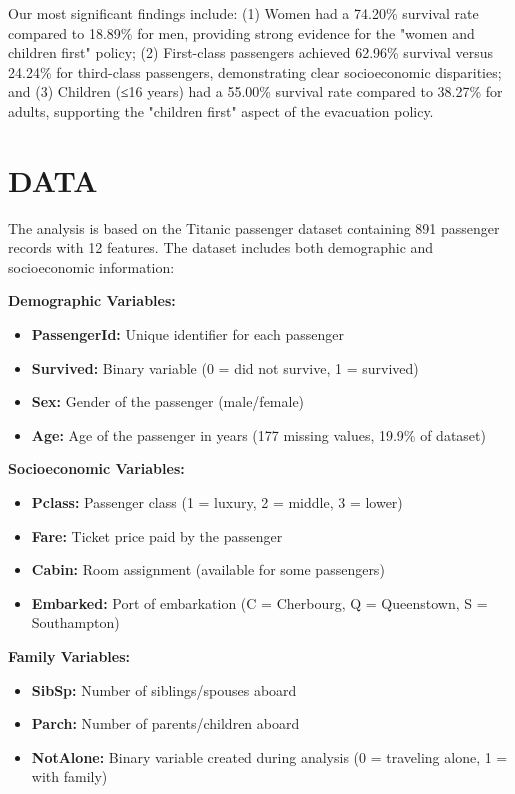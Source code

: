 \documentclass[letterpaper, 10 pt, conference]{ieeeconf}  %
\begin{document}
Our most significant findings include: (1) Women had a 74.20\% survival rate compared to 18.89\% for men, providing strong evidence for the "women and children first" policy; (2) First-class passengers achieved 62.96\% survival versus 24.24\% for third-class passengers, demonstrating clear socioeconomic disparities; and (3) Children (≤16 years) had a 55.00\% survival rate compared to 38.27\% for adults, supporting the "children first" aspect of the evacuation policy.

\section{DATA}

The analysis is based on the Titanic passenger dataset containing 891 passenger records with 12 features. The dataset includes both demographic and socioeconomic information:

\textbf{Demographic Variables:}
\begin{itemize}
\item \textbf{PassengerId:} Unique identifier for each passenger
\item \textbf{Survived:} Binary variable (0 = did not survive, 1 = survived)
\item \textbf{Sex:} Gender of the passenger (male/female)
\item \textbf{Age:} Age of the passenger in years (177 missing values, 19.9\% of dataset)
\end{itemize}

\textbf{Socioeconomic Variables:}
\begin{itemize}
\item \textbf{Pclass:} Passenger class (1 = luxury, 2 = middle, 3 = lower)
\item \textbf{Fare:} Ticket price paid by the passenger
\item \textbf{Cabin:} Room assignment (available for some passengers)
\item \textbf{Embarked:} Port of embarkation (C = Cherbourg, Q = Queenstown, S = Southampton)
\end{itemize}

\textbf{Family Variables:}
\begin{itemize}
\item \textbf{SibSp:} Number of siblings/spouses aboard
\item \textbf{Parch:} Number of parents/children aboard
\item \textbf{NotAlone:} Binary variable created during analysis (0 = traveling alone, 1 = with family)
\end{itemize}
\end{document}
